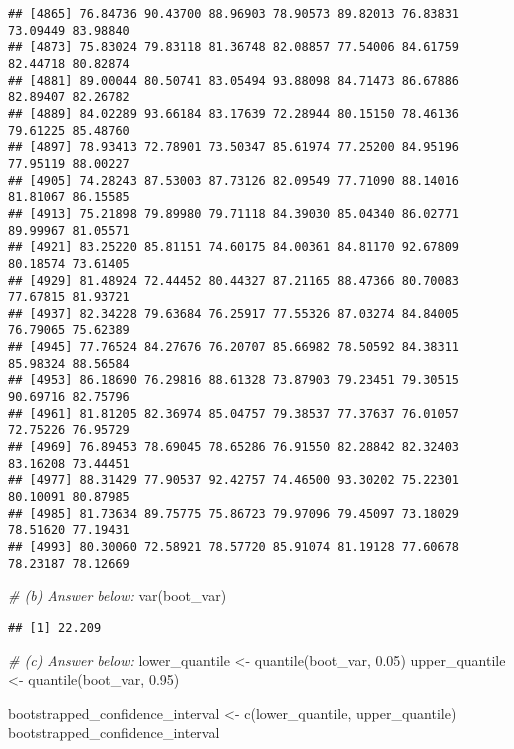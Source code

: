 \documentclass[
]{article}
\newenvironment{Shaded}{\begin{snugshade}}{\end{snugshade}}
\newcommand{\CommentTok}[1]{\textcolor[rgb]{0.56,0.35,0.01}{\textit{#1}}}
\newcommand{\FloatTok}[1]{\textcolor[rgb]{0.00,0.00,0.81}{#1}}
\newcommand{\FunctionTok}[1]{\textcolor[rgb]{0.00,0.00,0.00}{#1}}
\newcommand{\NormalTok}[1]{#1}
\newcommand{\OtherTok}[1]{\textcolor[rgb]{0.56,0.35,0.01}{#1}}
\begin{document}
\begin{verbatim}
## [4865] 76.84736 90.43700 88.96903 78.90573 89.82013 76.83831 73.09449 83.98840
## [4873] 75.83024 79.83118 81.36748 82.08857 77.54006 84.61759 82.44718 80.82874
## [4881] 89.00044 80.50741 83.05494 93.88098 84.71473 86.67886 82.89407 82.26782
## [4889] 84.02289 93.66184 83.17639 72.28944 80.15150 78.46136 79.61225 85.48760
## [4897] 78.93413 72.78901 73.50347 85.61974 77.25200 84.95196 77.95119 88.00227
## [4905] 74.28243 87.53003 87.73126 82.09549 77.71090 88.14016 81.81067 86.15585
## [4913] 75.21898 79.89980 79.71118 84.39030 85.04340 86.02771 89.99967 81.05571
## [4921] 83.25220 85.81151 74.60175 84.00361 84.81170 92.67809 80.18574 73.61405
## [4929] 81.48924 72.44452 80.44327 87.21165 88.47366 80.70083 77.67815 81.93721
## [4937] 82.34228 79.63684 76.25917 77.55326 87.03274 84.84005 76.79065 75.62389
## [4945] 77.76524 84.27676 76.20707 85.66982 78.50592 84.38311 85.98324 88.56584
## [4953] 86.18690 76.29816 88.61328 73.87903 79.23451 79.30515 90.69716 82.75796
## [4961] 81.81205 82.36974 85.04757 79.38537 77.37637 76.01057 72.75226 76.95729
## [4969] 76.89453 78.69045 78.65286 76.91550 82.28842 82.32403 83.16208 73.44451
## [4977] 88.31429 77.90537 92.42757 74.46500 93.30202 75.22301 80.10091 80.87985
## [4985] 81.73634 89.75775 75.86723 79.97096 79.45097 73.18029 78.51620 77.19431
## [4993] 80.30060 72.58921 78.57720 85.91074 81.19128 77.60678 78.23187 78.12669
\end{verbatim}

\begin{Shaded}
\begin{Highlighting}[]
\CommentTok{\# (b) Answer below:}
\FunctionTok{var}\NormalTok{(boot\_var)}
\end{Highlighting}
\end{Shaded}

\begin{verbatim}
## [1] 22.209
\end{verbatim}

\begin{Shaded}
\begin{Highlighting}[]
\CommentTok{\# (c) Answer below:}
\NormalTok{lower\_quantile }\OtherTok{\textless{}{-}} \FunctionTok{quantile}\NormalTok{(boot\_var, }\FloatTok{0.05}\NormalTok{)}
\NormalTok{upper\_quantile }\OtherTok{\textless{}{-}} \FunctionTok{quantile}\NormalTok{(boot\_var, }\FloatTok{0.95}\NormalTok{)}

\NormalTok{bootstrapped\_confidence\_interval }\OtherTok{\textless{}{-}} \FunctionTok{c}\NormalTok{(lower\_quantile, upper\_quantile)}
\NormalTok{bootstrapped\_confidence\_interval}
\end{Highlighting}
\end{Shaded}
\end{document}
